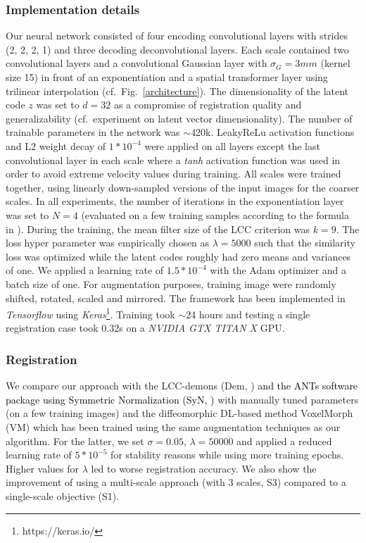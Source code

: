 \documentclass[journal]{IEEEtran}
\newcommand{\update}[1]{\textcolor{black}{#1}}
\begin{document}
\subsubsection{Implementation details} Our neural network consisted of four encoding convolutional layers with strides (2, 2, 2, 1) and three decoding deconvolutional layers. Each scale contained two convolutional layers and a convolutional Gaussian layer with $\sigma_G=3mm$ (kernel size 15) in front of an exponentiation and a spatial transformer layer using trilinear interpolation (cf.~Fig.\ \ref{architecture}). The dimensionality of the latent code $z$ was set to $d=32$ as a compromise of registration quality and generalizability (cf.\ experiment on latent vector dimensionality). The number of trainable parameters in the network was $\sim$420k. LeakyReLu activation functions and L2 weight decay of $1*10^{-4}$ were applied on all layers except the last convolutional layer in each scale where a \emph{tanh} activation function was used in order to avoid extreme velocity values during training. All scales were trained together, using linearly down-sampled versions of the input images for the coarser scales. In all experiments, the number of iterations in the exponentiation layer was set to $N=4$  (evaluated on a few training samples according to the formula in \cite{arsigny2006log}). During the training, the mean filter size of the LCC criterion was $k=9$. The loss hyper parameter was empirically chosen as $\lambda=5000$ such that the similarity loss was optimized while the latent codes roughly had zero means and variances of one. We applied a learning rate of $1.5*10^{-4}$ with the Adam optimizer and a batch size of one. For augmentation purposes, training image were randomly shifted, rotated, scaled and mirrored. The framework has been implemented in \textit{Tensorflow} using \textit{Keras}\footnote{https://keras.io/}. Training took $\sim$24 hours and testing a single registration case took 0.32s on a \textit{NVIDIA GTX TITAN X} GPU. 

\subsubsection{Registration}
We compare our approach with the LCC-demons (Dem, \cite{lorenzi2013lcc}) \update{and the ANTs software package using Symmetric Normalization (SyN, \cite{avants2008symmetric})} with manually tuned parameters (on a few training images) and the diffeomorphic DL-based method VoxelMorph \cite{dalca2018unsupervised} (VM) which has been trained using the same augmentation techniques as our algorithm. For the latter, we set $\sigma=0.05$, $\lambda=50000$ and applied a reduced learning rate of $5*10^{-5}$ for stability reasons while using more training epochs. Higher values for $\lambda$ led to worse registration accuracy. We also show the improvement of using a multi-scale approach (with 3 scales, S3) compared to a single-scale objective (S1). 
\end{document}
